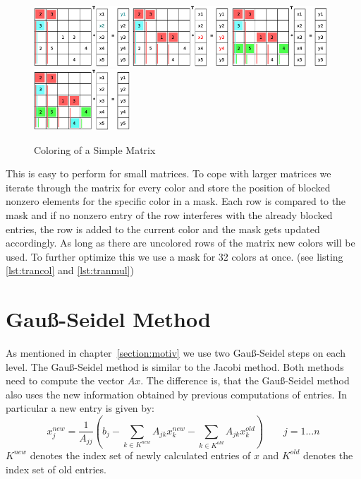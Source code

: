 \documentclass[a4paper,11pt]{scrartcl}
\begin{document}
\begin{figure}[ht]
\includegraphics[width=0.32\textwidth]{graphic/coloringT7.eps}
\includegraphics[width=0.32\textwidth]{graphic/coloringT8.eps}\hfill\vline\hfill
\includegraphics[width=0.32\textwidth]{graphic/coloringT9.eps}\hfill\vline\hfill
\includegraphics[width=0.32\textwidth]{graphic/coloringT10.eps}
\caption{Coloring of a Simple Matrix}\label{figure:coloring}
\end{figure}

This is easy to perform for small matrices. To cope with larger matrices we
iterate through the matrix for every color and store the position of blocked
nonzero elements for the specific color in a mask.
Each row is compared to the mask and if no nonzero entry of the row interferes
with the already blocked entries, the row is added to the current color and the
mask gets updated accordingly.
As long as there are uncolored rows of the matrix new colors will be used.
To further optimize this we use a mask for 32 colors at once. (see listing \ref{lst:trancol}
and \ref{lst:tranmul})



\section{Gauß-Seidel Method} \label{section:gs}
As mentioned in chapter~\ref{section:motiv} we use two Gauß-Seidel steps on
each level. The Gauß-Seidel method is similar to the Jacobi method.
Both methods need to compute the vector $Ax$. The difference is, that the
Gauß-Seidel method also uses the new information obtained by previous
computations of entries.
In particular a new entry is given by:
$$ x_j^{new} = \frac{1}{A_{jj}} \left(b_{j} - \sum_{k \in K^{new}}A_{jk}
x_k^{new} - \sum_{k \in K^{old}}A_{jk} x_k^{old}\right) \qquad j = 1 \dots n$$
$K^{new}$ denotes the index set of newly calculated entries
of $x$ and $K^{old}$ denotes the index set of old entries.
\cite{numerik} \cite{numpde}
\end{document}
